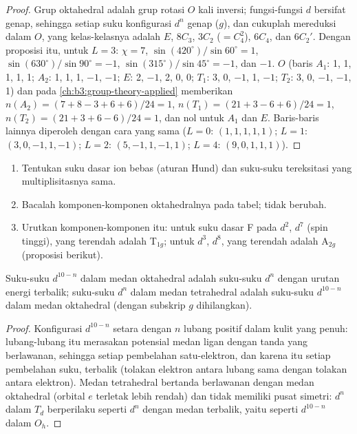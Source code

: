 \begin{proof}
Grup oktahedral adalah grup rotasi $O$ kali inversi; fungsi-fungsi $d$
bersifat genap, sehingga setiap suku konfigurasi $d^n$ genap ($g$), dan cukuplah
mereduksi dalam $O$, yang kelas-kelasnya adalah $E$, $8C_3$, $3C_2$ ($=C_4^2$), $6C_4$, dan $6C_2'$. Dengan
proposisi itu, untuk $L = 3$: $\chi = 7$, $\sin(420^\circ)/\sin60^\circ = 1$, $\sin(630^\circ)/\sin90^\circ = -1$, $\sin(315^\circ)/\sin45^\circ = -1$,
dan $-1$.  $O$ (baris $A_1$: 1, 1, 1, 1, 1; $A_2$: 1, 1, 1, $-1$, $-1$; $E$: 2,
$-1$, 2, 0, 0; $T_1$: 3, 0, $-1$, 1, $-1$; $T_2$: 3, 0, $-1$, $-1$, 1) dan  pada
\cref{ch:b3:group-theory-applied} memberikan $n(A_2) = (7 + 8 - 3 + 6 + 6)/24 = 1$, $n(T_1) = (21 + 3 - 6 +
6)/24 = 1$, $n(T_2) = (21 + 3 + 6 - 6)/24 = 1$, dan nol untuk $A_1$ dan $E$. Baris-baris lainnya
diperoleh dengan cara yang sama ($L = 0$: $(1, 1, 1, 1, 1)$; $L = 1$: $(3, 0, -1, 1, -1)$; $L = 2$: $(5, -1, 1,
-1, 1)$; $L = 4$: $(9, 0, 1, 1, 1)$).
\end{proof}

\begin{method}\label{met:b3:complex-spectra-magnetism:split-term}
\begin{enumerate}
  \item Tentukan suku dasar ion bebas (aturan Hund) dan suku-suku tereksitasi
        yang multiplisitasnya sama.
  \item Bacalah komponen-komponen oktahedralnya pada tabel; 
        tidak berubah.
  \item Urutkan komponen-komponen itu: untuk suku dasar F pada $d^2$, $d^7$ (spin tinggi), yang terendah adalah T$_{1g}$;
        untuk $d^3$, $d^8$, yang terendah adalah A$_{2g}$ (proposisi berikut).
\end{enumerate}
\end{method}

\begin{proposition}\label{prop:b3:complex-spectra-magnetism:hole}
Suku-suku $d^{10-n}$ dalam medan oktahedral adalah suku-suku $d^n$ dengan urutan energi
terbalik; suku-suku $d^n$ dalam medan tetrahedral adalah suku-suku $d^{10-n}$ dalam medan
oktahedral (dengan subskrip $g$ dihilangkan).
\end{proposition}

\begin{proof}
Konfigurasi $d^{10-n}$ setara dengan $n$ lubang positif dalam kulit yang penuh:
lubang-lubang itu merasakan potensial medan ligan dengan tanda yang berlawanan,
sehingga setiap pembelahan satu-elektron, dan karena itu setiap pembelahan
suku, terbalik (tolakan elektron antara lubang sama dengan tolakan antara
elektron). Medan tetrahedral bertanda berlawanan dengan medan oktahedral
(orbital $e$ terletak lebih rendah) dan tidak memiliki pusat simetri: $d^n$ dalam $T_d$ berperilaku seperti $d^n$ dengan
medan terbalik, yaitu seperti $d^{10-n}$ dalam $O_h$.
\end{proof}

